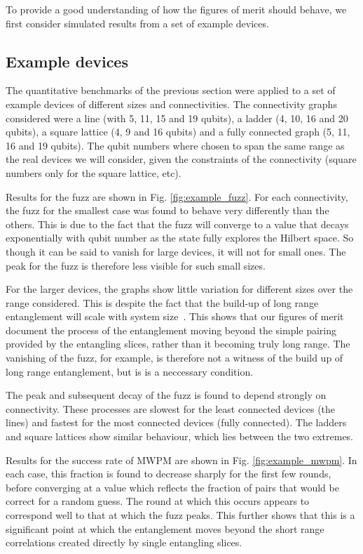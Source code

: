 \documentclass[aps,prl,twocolumn,showpacs,preprintnumbers]{revtex4-1}
\begin{document}
To provide a good understanding of how the figures of merit should behave, we first consider simulated results from a set of example devices.

\subsection{Example devices} \label{subsec:example}

The quantitative benchmarks of the previous section were applied to a set of example devices of different sizes and connectivities. The connectivity graphs considered were a line (with 5, 11, 15 and 19 qubits), a ladder (4, 10, 16 and 20 qubits), a square lattice (4, 9 and 16 qubits) and a fully connected graph (5, 11, 16 and 19 qubits). The qubit numbers where chosen to span the same range as the real devices we will consider, given the constraints of the connectivity (square numbers only for the square lattice, etc).


Results for the fuzz are shown in Fig. \ref{fig:example_fuzz}. For each connectivity, the fuzz for the smallest case was found to behave very differently than the others. This is due to the fact that the fuzz will converge to a value that decays exponentially with qubit number as the state fully explores the Hilbert space. So though it can be said to vanish for large devices, it will not for small ones. The peak for the fuzz is therefore less visible for such small sizes.

For the larger devices, the graphs show little variation for different sizes over the range considered. This is despite the fact that the build-up of long range entanglement will scale with system size~\cite{boixo:18}. This shows that our figures of merit document the process of the entanglement moving beyond the simple pairing provided by the entangling slices, rather than it becoming truly long range. The vanishing of the fuzz, for example, is therefore not a witness of the build up of long range entanglement, but is is a neccessary condition.

The peak and subsequent decay of the fuzz is found to depend strongly on connectivity. These processes are slowest for the least connected devices (the lines) and fastest for the most connected devices (fully connected). The ladders and square lattices show similar behaviour, which lies between the two extremes.

Results for the success rate of MWPM are shown in Fig. \ref{fig:example_mwpm}. In each case, this fraction is found to decrease sharply for the first few rounds, before converging at a value which reflects the fraction of pairs that would be correct for a random guess. The round at which this occurs appears to correspond well to that at which the fuzz peaks. This further shows that this is a significant point at which the entanglement moves beyond the short range correlations created directly by single entangling slices.
\end{document}
